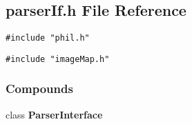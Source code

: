 \subsection{parser\-If.h File Reference}
\label{parserIf.h}
{\tt \#include "phil.h"}\par
{\tt \#include "image\-Map.h"}\par
\subsubsection*{Compounds}
\begin{CompactItemize}
\item 
class {\bf Parser\-Interface}
\end{CompactItemize}

